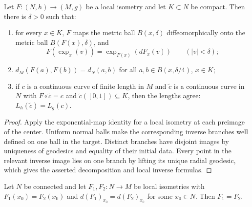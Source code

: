 \begin{lemma}
\label{lem:local-isometry-normal-balls}


Let $F\colon(N,h)\to(M,g)$ be a local isometry and let $K\subset
N$ be compact. Then there is $\delta>0$ such that:
\begin{enumerate}
\item for every $x\in K$, $F$ maps the metric ball $B(x,\delta)$
diffeomorphically onto the metric ball $B(F(x),\delta)$, and
$$F\left(\exp_x(v)\right)=\exp_{F(x)}\left(dF_x(v)\right)
\qquad(|v|<\delta);$$
\item $d_M\left(F(a),F(b)\right)=d_N(a,b)$ for all $a,b\in
B(x,\delta/4)$, $x\in K$;
\item if $c$ is a continuous curve of finite length in $M$ and
$\tilde c$ is a continuous curve in $N$ with $F\circ\tilde c=c$
and $\tilde c([0,1])\subseteq K$, then the lengths agree:
$L_h(\tilde c)=L_g(c)$.
\end{enumerate}
\end{lemma}

\begin{proof}
\sketch
{}
Apply the exponential-map identity for a local isometry at each preimage of the center. Uniform normal balls make the corresponding inverse branches well defined on one ball in the target. Distinct branches have disjoint images by uniqueness of geodesics and equality of their initial data. Every point in the relevant inverse image lies on one branch by lifting its unique radial geodesic, which gives the asserted decomposition and local inverse formulas.
\end{proof}

\begin{lemma}
\label{lem:local-isometry-rigidity}



Let $N$ be connected and let $F_1,F_2\colon N\to M$ be local
isometries with $F_1(x_0)=F_2(x_0)$ and $d(F_1)_{x_0}=d(F_2)_{x_0}$
for some $x_0\in N$. Then $F_1=F_2$.
\end{lemma}

